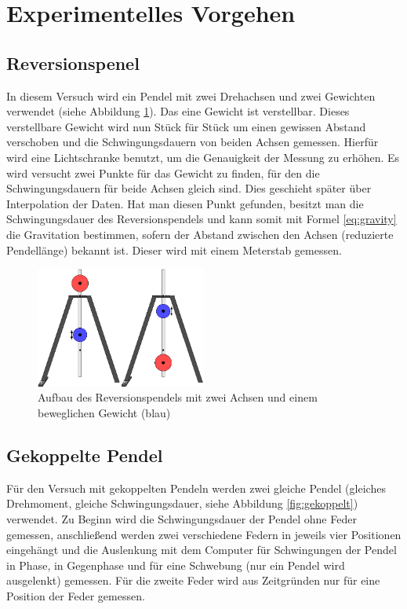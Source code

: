 \section{Experimentelles Vorgehen}

\subsection{Reversionspenel}
In diesem Versuch wird ein Pendel mit zwei Drehachsen und zwei Gewichten verwendet (siehe Abbildung \ref{fig:reversion}). Das eine Gewicht ist verstellbar. Dieses verstellbare Gewicht wird nun Stück für Stück um einen gewissen Abstand verschoben und die Schwingungsdauern von beiden Achsen gemessen. Hierfür wird eine Lichtschranke benutzt, um die Genauigkeit der Messung zu erhöhen. Es wird versucht zwei Punkte für das Gewicht zu finden, für den die Schwingungsdauern für beide Achsen gleich sind. Dies geschieht später über Interpolation der Daten. Hat man diesen Punkt gefunden, besitzt man die Schwingungsdauer des Reversionspendels und kann somit mit Formel \ref{eq:gravity} die Gravitation bestimmen, sofern der Abstand zwischen den Achsen (reduzierte Pendellänge) bekannt ist. Dieser wird mit einem Meterstab gemessen.

\begin{figure}
\centering
\includegraphics[width=0.5\textwidth]{Bilder/Versuch1.eps}
\caption{Aufbau des Reversionspendels mit zwei Achsen und einem beweglichen Gewicht (blau)}
\label{fig:reversion}
\end{figure}


\subsection{Gekoppelte Pendel}
Für den Versuch mit gekoppelten Pendeln werden zwei gleiche Pendel (gleiches Drehmoment, gleiche Schwingungsdauer, siehe Abbildung \ref{fig:gekoppelt}) verwendet. Zu Beginn wird die Schwingungsdauer der Pendel ohne Feder gemessen, anschließend werden zwei verschiedene Federn in jeweils vier Positionen eingehängt und die Auslenkung mit dem Computer für Schwingungen der Pendel in Phase, in Gegenphase und für eine Schwebung (nur ein Pendel wird ausgelenkt) gemessen. Für die zweite Feder wird aus Zeitgründen nur für eine Position der Feder gemessen.


